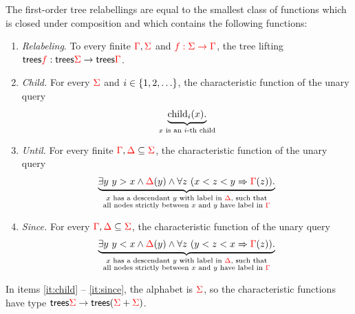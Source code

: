 \begin{lemma}\label{lem:schlingloff} The first-order tree relabellings are equal to the smallest class of functions which is closed under composition and which  contains the following functions:
    \begin{enumerate}
        \item \label{it:relabeling} \emph{Relabeling}. To every finite ${\color{red}{\Gamma}},{\color{red}{\Sigma}}$ and ${\color{red}{f : {\color{red}{\Sigma}}\to {\color{red}{\Gamma}}}}$, the tree lifting $\mathsf {trees} {\color{red}{f}} : \mathsf {trees} {\color{red}{\Sigma}} \to \mathsf {trees} {\color{red}{\Gamma}}$.
        \item \label{it:child} \emph{Child.} For every ${\color{red}{\Sigma}}$ and  $i \in \{1,2,\ldots\}$, the characteristic function of the  unary query 
        \begin{align*}
            \underbrace{\mathrm{child}_{i} (x).}_{\text{$x$ is an $i$-th child}}
        \end{align*}
         \item \label{it:until} \emph{Until.} For every finite ${\color{red}{\Gamma}}, {\color{red}{\Delta}} \subseteq {\color{red}{\Sigma}}$,  the characteristic function of the unary query
         \begin{align*}
              \underbrace{\exists y\ y > x \land {\color{red}{\Delta}}(y) \land  \forall z \ (x < z < y \Rightarrow {\color{red}{\Gamma}}(z)).}_{\substack{\text{$x$ has a descendant $y$ with label in ${\color{red}{\Delta}}$, such that}\\ \text{all nodes strictly between $x$ and $y$ have label in ${\color{red}{\Gamma}}$}}} 
         \end{align*} 
         \item \label{it:since}\emph{Since.} For every ${\color{red}{\Gamma}}, {\color{red}{\Delta}} \subseteq {\color{red}{\Sigma}}$,    the characteristic function of the unary query
         \begin{align*}
              \underbrace{\exists y\ y < x \land {\color{red}{\Delta}}(y) \land  \forall z \ (y < z < x \Rightarrow {\color{red}{\Gamma}}(z)).}_{\substack{\text{$x$ has a descendant $y$ with label in ${\color{red}{\Delta}}$, such that}\\ \text{all nodes strictly between $x$ and $y$ have label in ${\color{red}{\Gamma}}$}}}  
         \end{align*} 
    \end{enumerate}
    In items \ref{it:child} -- \ref{it:since}, the alphabet is ${\color{red}{\Sigma}}$, so the characteristic functions have type $\mathsf {trees} {\color{red}{\Sigma}} \to \mathsf {trees}({\color{red}{\Sigma}} + {\color{red}{\Sigma}})$. 
\end{lemma}

